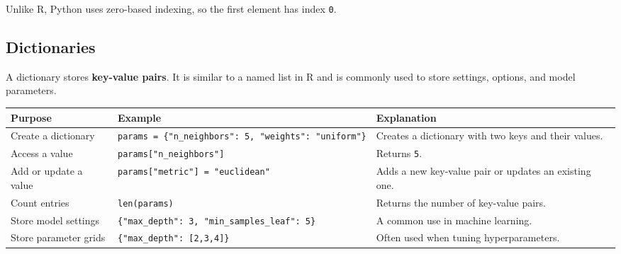 \documentclass[
  letterpaper,
  DIV=11,
  numbers=noendperiod]{scrreprt}
\newcounter{none} %
\theoremstyle{definition}
\theoremstyle{definition}
\theoremstyle{plain}
\theoremstyle{plain}
\theoremstyle{remark}
\begin{document}
\begin{tcolorbox}[enhanced jigsaw, arc=.35mm, bottomrule=.15mm, bottomtitle=1mm, breakable, colback=white, colbacktitle=quarto-callout-note-color!10!white, colframe=quarto-callout-note-color-frame, coltitle=black, left=2mm, leftrule=.75mm, opacityback=0, opacitybacktitle=0.6, rightrule=.15mm, title=\textcolor{quarto-callout-note-color}{\faInfo}\hspace{0.5em}{Note}, titlerule=0mm, toprule=.15mm, toptitle=1mm]

Unlike R, Python uses zero-based indexing, so the first element has
index \texttt{0}.

\end{tcolorbox}

\subsection{Dictionaries}\label{dictionaries}

A dictionary stores \textbf{key-value pairs}. It is similar to a named
list in R and is commonly used to store settings, options, and model
parameters.

{\def\LTcaptype{none} %
\begin{longtable}[]{@{}
  >{\raggedright\arraybackslash}p{}
  >{\raggedright\arraybackslash}p{}
  >{\raggedright\arraybackslash}p{}@{}}
\toprule\noalign{}
\begin{minipage}[b]{\linewidth}\raggedright
Purpose
\end{minipage} & \begin{minipage}[b]{\linewidth}\raggedright
Example
\end{minipage} & \begin{minipage}[b]{\linewidth}\raggedright
Explanation
\end{minipage} \\
\midrule\noalign{}
\endhead
\bottomrule\noalign{}
\endlastfoot
Create a dictionary &
\texttt{params\ =\ \{"n\_neighbors":\ 5,\ "weights":\ "uniform"\}} &
Creates a dictionary with two keys and their values. \\
Access a value & \texttt{params{[}"n\_neighbors"{]}} & Returns
\texttt{5}. \\
Add or update a value & \texttt{params{[}"metric"{]}\ =\ "euclidean"} &
Adds a new key-value pair or updates an existing one. \\
Count entries & \texttt{len(params)} & Returns the number of key-value
pairs. \\
Store model settings &
\texttt{\{"max\_depth":\ 3,\ "min\_samples\_leaf":\ 5\}} & A common use
in machine learning. \\
Store parameter grids & \texttt{\{"max\_depth":\ {[}2,3,4{]}\}} & Often
used when tuning hyperparameters. \\
\end{longtable}
}
\end{document}
